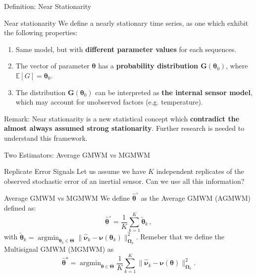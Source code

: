 \documentclass[envcountsect,usenames,dvipsnames]{beamer}
\DeclareMathOperator*{\argmin}{argmin}
\def\btheta{\bm \theta}
\theoremstyle{mystyle}
\begin{document}
\begin{frame}{Definition: Near Stationarity}
	\begin{block}{Near stationarity}
	We define a nearly stationary time series, as one which exhibit the following properties:
	
		\begin{enumerate}
			\item Same model, but with {\color{beamer@UIUCblue}\textbf{different parameter values}} for each sequences.
			\item The vector of parameter $\btheta$ has a {\color{beamer@UIUCblue} \textbf {probability distribution $\bm{G}(\btheta_0)$}}, where $\mathbb{E}[G] = \btheta_0$.
			\item The distribution $\bm{G}(\btheta_0)$ can be interpreted as {\color{beamer@UIUCblue}\textbf{the internal sensor model}}, which may account for unobserved factors (e.g. temperature).
		\end{enumerate}
	\end{block}
	
	\begin{exampleblock}{Remark:}
	Near stationarity is a new statistical concept which {\color{beamer@myorange}\textbf{contradict the almost always assumed strong stationarity}}. Further research is needed to understand this framework. 
	\end{exampleblock}
	
\end{frame}



\begin{frame}{Two Estimators: Average GMWM vs MGMWM}

\begin{alertblock}{Replicate Error Signals}
Let us assume we have $K$ independent replicates of the observed stochastic error of an inertial sensor. Can we use all this information?
\end{alertblock}

\begin{block}{Average GMWM vs MGMWM}
    We define $\bm{\hat{\theta}}^{\circ}$ as the Average GMWM (AGMWM) defined as:
    \vspace{-0.3cm}
        \begin{equation*}
                \bm{\hat{\theta}}^{\circ} = \frac{1}{K}\sum^K_{k = 1} \tilde{\bm{\theta}}_k \,,
        \end{equation*}
with $\tilde{\bm{\theta}}_k = \argmin_{\bm{\theta}_k \in \bm{\Theta}} \| \hat{\bm{\nu}}_k - {\bm{\nu}}(\bm{\theta}_k)\|^2_{\bm{\Omega}_k}$. Remeber that we define the Multisignal GMWM (MGMWM) as 
\vspace{-0.3cm}
$$\hat{\btheta}^{\star} = \argmin_{\bm{\theta} \in \bm{\Theta}} \frac{1}{K}\sum_{k=1}^K\| \hat{\bm{\nu}}_k - {\bm{\nu}}(\bm{\theta})\|^2_{\bm{\Omega}_k}.$$
\end{block}
\end{frame}
\end{document}
